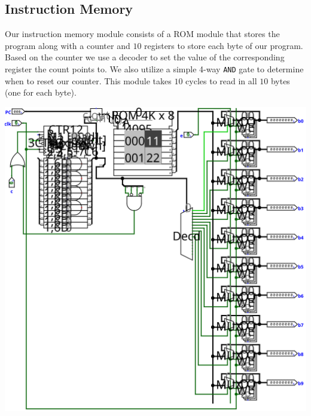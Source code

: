 \documentclass{article}
\begin{document}
\subsection{Instruction Memory}
Our instruction memory module consists of a ROM module that stores the program along with a counter and $10$ registers to store each byte of our program. Based on the counter we use a decoder to set the value of the corresponding register the count points to. We also utilize a simple 4-way \verb+AND+ gate to determine when to reset our counter. This module takes $10$ cycles to read in all $10$ bytes (one for each byte).
\begin{center}
    \includegraphics[scale=.45, angle=90]{instrucMem.png}
\end{center}
\end{document}

